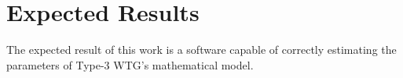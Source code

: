 \chapter{Expected Results}

\label{ch: Res}

The expected result of this work is a software capable of correctly estimating the parameters of Type-3 WTG's mathematical model. 


